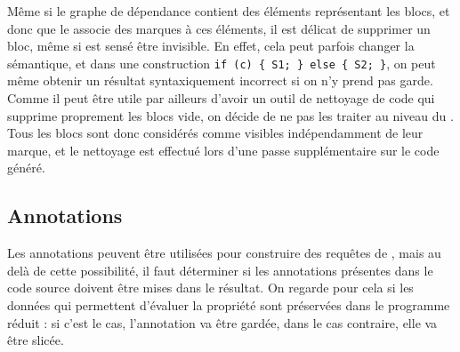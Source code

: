 Même si le graphe de dépendance contient des éléments représentant les blocs,
et donc que le \slicing associe des marques à ces éléments,
il est délicat de supprimer un bloc, même si est sensé être invisible.
En effet, cela peut parfois changer la sémantique,
et dans une construction \verb!if (c) { S1; } else { S2; }!,
on peut même obtenir un résultat syntaxiquement incorrect
si on n'y prend pas garde.\\

Comme il peut être utile par ailleurs d'avoir un outil de nettoyage de code
qui supprime proprement les blocs vide, on décide de ne pas les traiter 
au niveau du \slicing. Tous les blocs sont donc considérés comme visibles
indépendamment de leur marque, et le nettoyage est effectué lors d'une passe
supplémentaire sur le code généré.

\subsection{Annotations}

Les annotations peuvent être utilisées pour construire des requêtes de \slicing,
mais au delà de cette possibilité, il faut déterminer si les annotations
présentes dans le code source doivent être mises dans le résultat.
On regarde pour cela si les données qui permettent d'évaluer la propriété sont
préservées dans le programme réduit : si c'est le cas, l'annotation va être
gardée, dans le cas contraire, elle va être slicée.
